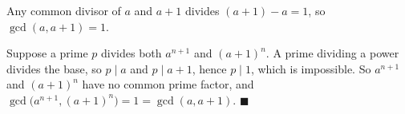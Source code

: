 Any common divisor of $a$ and $a+1$ divides $(a+1)-a=1$, so $\gcd(a,a+1)=1$.

Suppose a prime $p$ divides both $a^{n+1}$ and $(a+1)^n$. A prime dividing a power divides the base, so $p\mid a$ and $p\mid a+1$, hence $p\mid1$, which is impossible. So $a^{n+1}$ and $(a+1)^n$ have no common prime factor, and $\gcd\bigl(a^{n+1},(a+1)^n\bigr)=1=\gcd(a,a+1)$. $\blacksquare$
